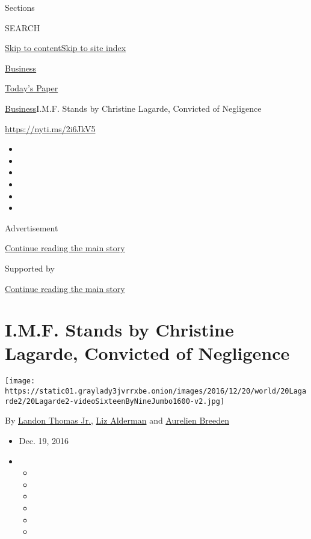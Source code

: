 Sections

SEARCH

\protect\hyperlink{site-content}{Skip to
content}\protect\hyperlink{site-index}{Skip to site index}

\href{https://www.nytimes3xbfgragh.onion/section/business}{Business}

\href{https://myaccount.nytimes3xbfgragh.onion/auth/login?response_type=cookie\&client_id=vi}{}

\href{https://www.nytimes3xbfgragh.onion/section/todayspaper}{Today's
Paper}

\href{/section/business}{Business}\textbar{}I.M.F. Stands by Christine
Lagarde, Convicted of Negligence

\url{https://nyti.ms/2i6JkV5}

\begin{itemize}
\item
\item
\item
\item
\item
\item
\end{itemize}

Advertisement

\protect\hyperlink{after-top}{Continue reading the main story}

Supported by

\protect\hyperlink{after-sponsor}{Continue reading the main story}

\hypertarget{imf-stands-by-christine-lagarde-convicted-of-negligence}{%
\section{I.M.F. Stands by Christine Lagarde, Convicted of
Negligence}\label{imf-stands-by-christine-lagarde-convicted-of-negligence}}

\texttt{[image: https://static01.graylady3jvrrxbe.onion/images/2016/12/20/world/20Lagarde2/20Lagarde2-videoSixteenByNineJumbo1600-v2.jpg]}

By \href{http://www.nytimes3xbfgragh.onion/by/landon-thomas-jr}{Landon
Thomas Jr.},
\href{https://www.nytimes3xbfgragh.onion/by/liz-alderman}{Liz Alderman}
and
\href{https://www.nytimes3xbfgragh.onion/by/aurelien-breeden}{Aurelien
Breeden}

\begin{itemize}
\item
  Dec. 19, 2016
\item
  \begin{itemize}
  \item
  \item
  \item
  \item
  \item
  \item
  \end{itemize}
\end{itemize}


